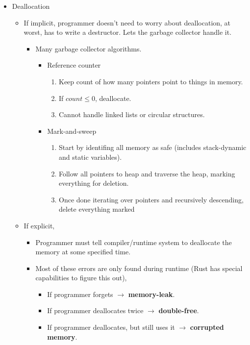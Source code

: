 \begin{itemize}
\item Deallocation
  \begin{itemize}[noitemsep]
  \item If implicit, programmer doesn't need to worry about deallocation, at worst, has to write a destructor. Lets the garbage collector handle it.
    \begin{itemize}[noitemsep]
    \item Many garbage collector algorithms.
      \begin{itemize}[noitemsep]
      \item Reference counter
        \begin{enumerate}[noitemsep]
        \item Keep count of how many pointers point to things in memory.
        \item If $count \leq 0$, deallocate.
        \item Cannot handle linked lists or circular structures.
        \end{enumerate}
      \item Mark-and-sweep
        \begin{enumerate}[noitemsep]
        \item Start by identifing all memory as safe (includes stack-dynamic and static variables).
        \item Follow all pointers to heap and traverse the heap, marking everything for deletion.
        \item Once done iterating over pointers and recursively descending, delete everything marked
        \end{enumerate}
      \end{itemize}
    \end{itemize}
  \item If explicit,
    \begin{itemize}[noitemsep]
    \item Programmer must tell compiler/runtime system to deallocate the memory at some specified time.
    \item Most of these errors are only found during runtime (Rust has special capabilities to figure this out),
      \begin{itemize}[noitemsep]
      \item If programmer forgets $\rightarrow$ \textbf{memory-leak}.
      \item If programmer deallocates twice $\rightarrow$ \textbf{double-free}.
      \item If programmer deallocates, but still uses it $\rightarrow$ \textbf{corrupted memory}.
      \end{itemize}
    \end{itemize}
  \end{itemize}
\end{itemize}

